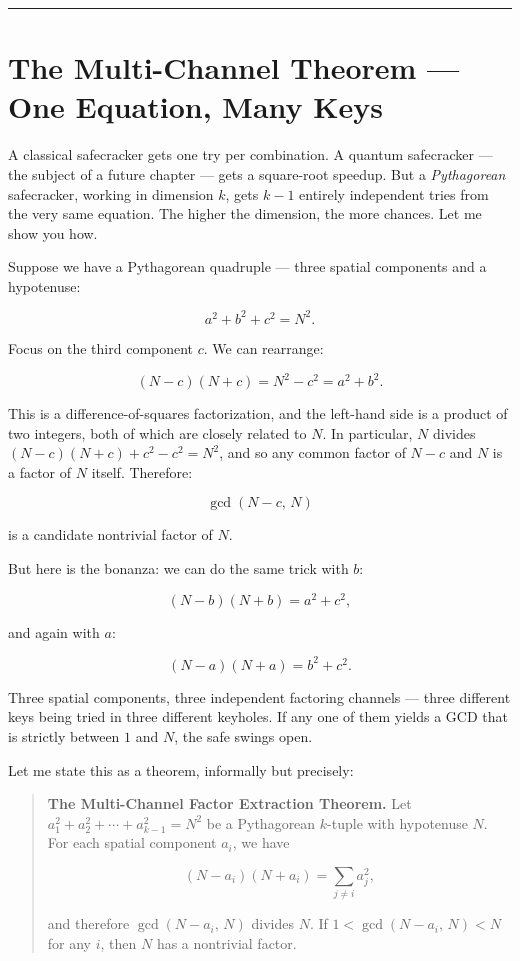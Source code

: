\documentclass[12pt, letterpaper, openany]{book}
\theoremstyle{definition}
\theoremstyle{remark}
\begin{document}
\bigskip\noindent\rule{\textwidth}{0.4pt}\bigskip



\section*{The Multi-Channel Theorem --- One Equation, Many Keys}


A classical safecracker gets one try per combination. A quantum safecracker --- the subject of a future chapter --- gets a square-root speedup. But a \textit{Pythagorean} safecracker, working in dimension $k$, gets $k - 1$ entirely independent tries from the very same equation. The higher the dimension, the more chances. Let me show you how.

Suppose we have a Pythagorean quadruple --- three spatial components and a hypotenuse:

\[
a^2 + b^2 + c^2 = N^2.
\]

Focus on the third component $c$. We can rearrange:

\[
(N - c)(N + c) = N^2 - c^2 = a^2 + b^2.
\]

This is a difference-of-squares factorization, and the left-hand side is a product of two integers, both of which are closely related to $N$. In particular, $N$ divides $(N - c)(N + c) + c^2 - c^2 = N^2$, and so any common factor of $N - c$ and $N$ is a factor of $N$ itself. Therefore:

\[
\gcd(N - c, \, N)
\]

is a candidate nontrivial factor of $N$.

But here is the bonanza: we can do the same trick with $b$:

\[
(N - b)(N + b) = a^2 + c^2,
\]

and again with $a$:

\[
(N - a)(N + a) = b^2 + c^2.
\]

Three spatial components, three independent factoring channels --- three different keys being tried in three different keyholes. If any one of them yields a GCD that is strictly between $1$ and $N$, the safe swings open.

Let me state this as a theorem, informally but precisely:


\begin{quote}
\textbf{The Multi-Channel Factor Extraction Theorem.} Let $a_1^2 + a_2^2 + \cdots + a_{k-1}^2 = N^2$ be a Pythagorean $k$-tuple with hypotenuse $N$. For each spatial component $a_i$, we have

$$(N - a_i)(N + a_i) = \sum_{j \ne i} a_j^2,$$

and therefore $\gcd(N - a_i, \, N)$ divides $N$. If $1 < \gcd(N - a_i, \, N) < N$ for any $i$, then $N$ has a nontrivial factor.
\end{quote}
\end{document}
